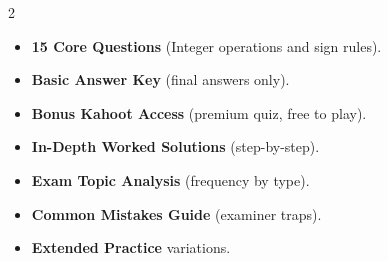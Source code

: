 \documentclass[11pt,a4paper]{article}
\newcommand{\FullReleaseDate}{April 30, 2026}
\begin{document}
\vspace{8pt}

\begin{multicols}{2}
  \begin{tcolorbox}[card, title=\sffamily\bfseries\textcolor{white}{\faHandPointDown\ TODAY (Simplified Version)}, colbacktitle=mainblue, boxed title style={sharp corners, boxrule=0pt}]
    \begin{itemize}[leftmargin=1.2em, itemsep=2pt]
      \item \small \textbf{15 Core Questions} (Integer operations and sign rules).
      \item \small \textbf{Basic Answer Key} (final answers only).
      \item \small \textbf{Bonus Kahoot Access} (premium quiz, free to play).
    \end{itemize}
  \end{tcolorbox}

  \columnbreak

  \begin{tcolorbox}[card, title=\sffamily\bfseries\textcolor{white}{\faRocket\ ON \FullReleaseDate\ (Full Upgrade)}, colbacktitle=mainblue, boxed title style={sharp corners, boxrule=0pt}]
    \begin{itemize}[leftmargin=1.2em, itemsep=2pt]
      \item \small \textbf{In-Depth Worked Solutions} (step-by-step).
      \item \small \textbf{Exam Topic Analysis} (frequency by type).
      \item \small \textbf{Common Mistakes Guide} (examiner traps).
      \item \small \textbf{Extended Practice} variations.
    \end{itemize}
  \end{tcolorbox}
\end{multicols}
\end{document}
